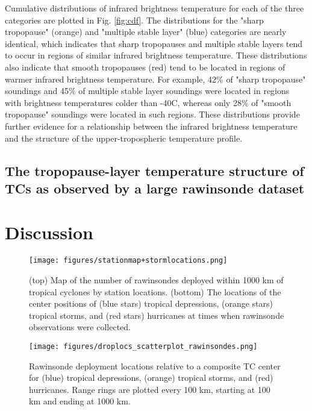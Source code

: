Cumulative distributions of infrared brightness temperature for each of the three categories are plotted in Fig. \ref{fig:cdf}.
The distributions for the "sharp tropopause" (orange) and "multiple stable layer" (blue) categories are nearly identical, which indicates that sharp tropopauses and multiple stable layers tend to occur in regions of similar infrared brightness temperature.
These distributions also indicate that smooth tropopauses (red) tend to be located in regions of warmer infrared brightness temperature.
For example, 42\% of "sharp tropopause" soundings and 45\% of multiple stable layer soundings were located in regions with brightness temperatures colder than -40\textdegree{}C, whereas only 28\% of "smooth tropopause" soundings were located in such regions.
These distributions provide further evidence for a relationship between the infrared brightness temperature and the structure of the upper-tropospheric temperature profile.

\subsection{The tropopause-layer temperature structure of TCs as observed by a large rawinsonde dataset}


\section{Discussion}
\label{sec:discussion}


\begin{figure*}[ht]
\centerline{\texttt{[image: figures/stationmap+stormlocations.png]}}
\caption{(top) Map of the number of rawinsondes deployed within 1000 km of tropical cyclones by station locations. (bottom) The locations of the center positions of (blue stars) tropical depressions, (orange stars) tropical storms, and (red stars) hurricanes at times when rawinsonde observations were collected.}
\label{fig:maps}
\end{figure*}

\begin{figure*}[ht]
\centerline{\texttt{[image: figures/droplocs\_scatterplot\_rawinsondes.png]}}
\caption{Rawinsonde deployment locations relative to a composite TC center for (blue) tropical depressions, (orange) tropical storms, and (red) hurricanes. Range rings are plotted every 100 km, starting at 100 km and ending at 1000 km.}
\label{fig:scatterplot}
\end{figure*}

